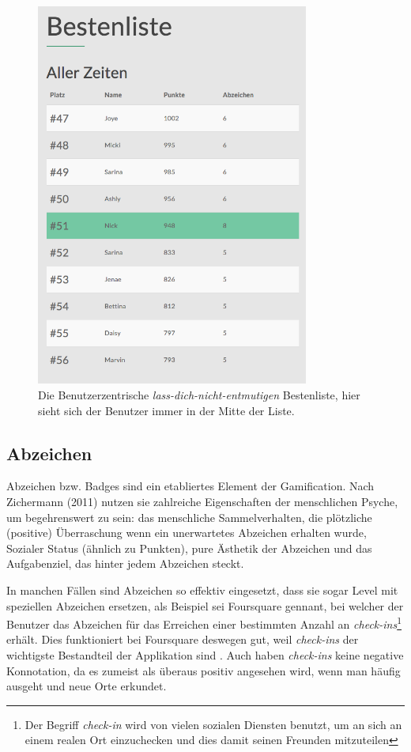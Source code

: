 \documentclass[12pt,twoside]{book}
\begin{document}
\begin{figure}[htbp]
    \centering
    \includegraphics[width=0.8\textwidth]{images/infoboard_leaderboard_user.png}
    \caption{Die Benutzerzentrische \textit{lass-dich-nicht-entmutigen} Bestenliste, hier sieht sich der Benutzer immer in der Mitte der Liste.}
    \label{fig:leaderboarduser}
\end{figure}

\subsection{Abzeichen}
Abzeichen bzw. Badges sind ein etabliertes Element der Gamification. Nach Zichermann (2011) \citep[pp. 55]{zichermann2011gamification} nutzen sie zahlreiche Eigenschaften der menschlichen Psyche, um begehrenswert zu sein: das menschliche Sammelverhalten, die plötzliche (positive) Überraschung wenn ein unerwartetes Abzeichen erhalten wurde, Sozialer Status (ähnlich zu Punkten), pure Ästhetik der Abzeichen und das Aufgabenziel, das hinter jedem Abzeichen steckt.

In manchen Fällen sind Abzeichen so effektiv eingesetzt, dass sie sogar Level mit speziellen Abzeichen ersetzen, als Beispiel sei Foursquare gennant, bei welcher der Benutzer das Abzeichen für das Erreichen einer bestimmten Anzahl an \textit{check-ins}\footnote{Der Begriff \textit{check-in} wird von vielen sozialen Diensten benutzt, um an sich an einem realen Ort \glqq einzuchecken\grqq{} und dies damit seinen Freunden mitzuteilen} erhält. Dies funktioniert bei Foursquare deswegen gut, weil \textit{check-ins} der wichtigste Bestandteil der Applikation sind \citep[pp. 57]{zichermann2011gamification}. Auch haben \textit{check-ins} keine negative Konnotation, da es zumeist als überaus positiv angesehen wird, wenn man häufig ausgeht und neue Orte erkundet.
\end{document}
